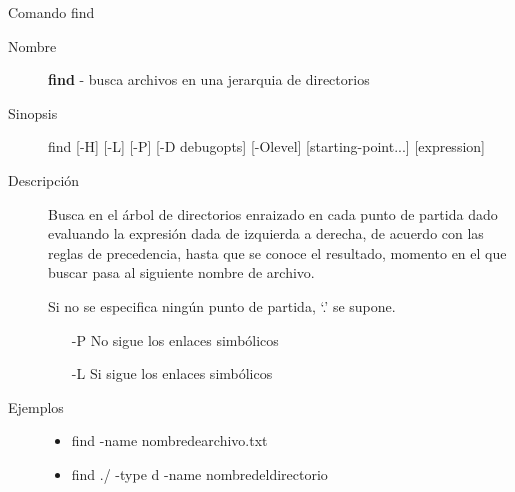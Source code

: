 \begin{frame}[c]{Comando find}
  \begin{description}
    \item[Nombre]
      \textbf{find} - busca archivos en una jerarquia de directorios

    \vspace{\baselineskip}
    \item[Sinopsis]
      find  [-H]  [-L] [-P] [-D debugopts] [-Olevel] [starting-point...] [expression]

    \vspace{\baselineskip}
    \item[Descripción]
      Busca en el árbol de directorios enraizado en cada punto de partida
      dado evaluando la expresión dada de izquierda a derecha, de acuerdo
      con las reglas de precedencia, hasta que se conoce el resultado,
      momento en el que buscar pasa al siguiente nombre de archivo.

      Si no se especifica ningún punto de partida, `.' se supone.

      \begin{itemize}
        \item [-P] No sigue los enlaces simbólicos
        \item [-L] Si sigue los enlaces simbólicos
      \end{itemize}

    \vspace{\baselineskip}
    \item[Ejemplos]
      \begin{itemize}
        \item find -name nombredearchivo.txt
        \item find ./ -type d -name nombredeldirectorio
      \end{itemize}
  \end{description}
\end{frame}

